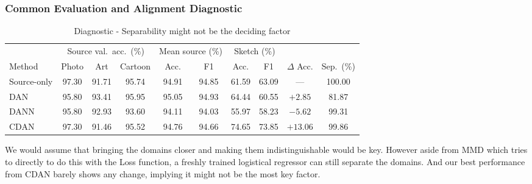 \documentclass{article}
\begin{document}
\subsubsection{Common Evaluation and Alignment Diagnostic}

\begin{table}[tb]
  \caption{Diagnostic - Separability might not be the deciding factor}
  \label{tab:t2-diagnostic}
  \centering
  \footnotesize
  \begin{tabular}{lccccccccc}
    \toprule
    & \multicolumn{3}{c}{Source val.\ acc.\ (\%)} & \multicolumn{2}{c}{Mean source (\%)} & \multicolumn{2}{c}{Sketch (\%)} & & \\
    \cmidrule(lr){2-4} \cmidrule(lr){5-6} \cmidrule(lr){7-8}
    Method & Photo & Art & Cartoon & Acc. & F1 & Acc. & F1 & $\Delta$ Acc. & Sep.\ (\%) \\
    \midrule
    Source-only & 97.30 & 91.71 & 95.74 & 94.91 & 94.85 & 61.59 & 63.09 & ---       & 100.00 \\
    DAN         & 95.80 & 93.41 & 95.95 & 95.05 & 94.93 & 64.44 & 60.55 & $+2.85$   &  81.87 \\
    DANN        & 95.80 & 92.93 & 93.60 & 94.11 & 94.03 & 55.97 & 58.23 & $-5.62$   &  99.31 \\
    CDAN        & 97.30 & 91.46 & 95.52 & 94.76 & 94.66 & 74.65 & 73.85 & $+13.06$  &  99.86 \\
    \bottomrule
  \end{tabular}
\end{table}

We would assume that bringing the domains closer and making them indistinguishable would be key. However aside from MMD which tries to directly to do this with the Loss function, a freshly trained logistical regressor can
still separate the domains. And our best performance from CDAN barely shows any change, implying it might not be the most key factor.
\end{document}
